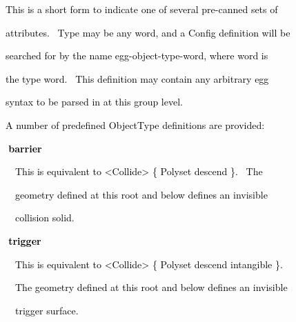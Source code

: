 \documentclass[a4paper]{article}
\newcommand\textstyleOOoComputerKeyWord[1]{\textrm{\textcolor[rgb]{0.0,0.0,0.5019608}{#1}}}
\begin{document}
{\color{black}
\textstyleOOoComputerKeyWord{\textcolor{black}{\ \ \ \ This is a short form to indicate one of several pre-canned sets
of}}}

{\color{black}
\textstyleOOoComputerKeyWord{\textcolor{black}{\ \ \ \ attributes. \ Type may be any word, and a Config definition will
be}}}

{\color{black}
\textstyleOOoComputerKeyWord{\textcolor{black}{\ \ \ \ searched for by the name
{\textquotedbl}egg-object-type-word{\textquotedbl}, where {\textquotedbl}word{\textquotedbl} is}}}

{\color{black}
\textstyleOOoComputerKeyWord{\textcolor{black}{\ \ \ \ the type word. \ This definition may contain any arbitrary egg}}}

{\color{black}
\textstyleOOoComputerKeyWord{\textcolor{black}{\ \ \ \ syntax to be parsed in at this group level.}}}


\bigskip

{\color{black}
\textstyleOOoComputerKeyWord{\textcolor{black}{\ \ \ \ A number of predefined ObjectType definitions are provided:}}}


\bigskip

{\bfseries
\hypertarget{RefHeading7710869075401}{}\textstyleOOoComputerKeyWord{\textcolor{black}{\ \ \ \ barrier}}}


\bigskip

{\color{black}
\textstyleOOoComputerKeyWord{\textcolor{black}{\ \ \ \ \ \ This is equivalent to {\textless}Collide{\textgreater} \{
Polyset descend \}. \ The}}}

{\color{black}
\textstyleOOoComputerKeyWord{\textcolor{black}{\ \ \ \ \ \ geometry defined at this root and below defines an
invisible}}}

{\color{black}
\textstyleOOoComputerKeyWord{\textcolor{black}{\ \ \ \ \ \ collision solid.}}}


\bigskip

{\bfseries
\hypertarget{RefHeading7712869075401}{}\textstyleOOoComputerKeyWord{\textcolor{black}{\ \ \ \ trigger}}}


\bigskip

{\color{black}
\textstyleOOoComputerKeyWord{\textcolor{black}{\ \ \ \ \ \ This is equivalent to {\textless}Collide{\textgreater} \{
Polyset descend intangible \}.}}}

{\color{black}
\textstyleOOoComputerKeyWord{\textcolor{black}{\ \ \ \ \ \ The geometry defined at this root and below defines an
invisible}}}

{\color{black}
\textstyleOOoComputerKeyWord{\textcolor{black}{\ \ \ \ \ \ trigger surface.}}}
\end{document}
